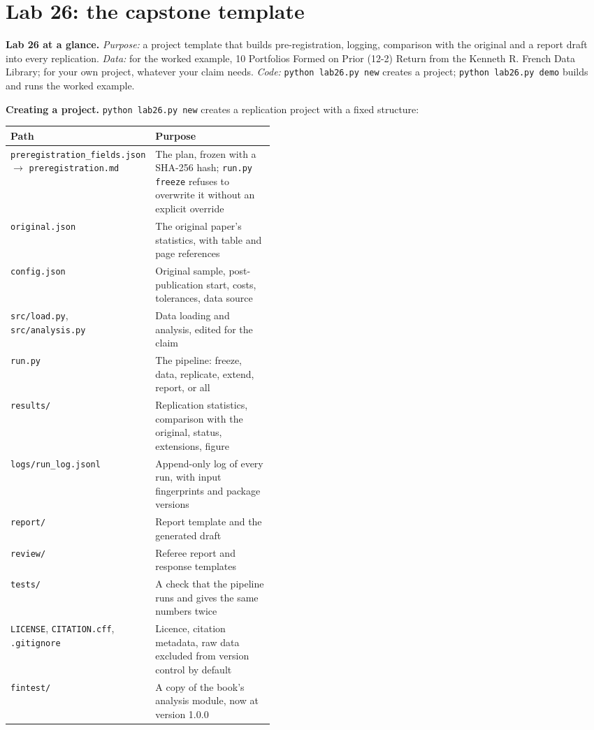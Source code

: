\section{Lab 26: the capstone template}
\label{sec:26-lab}

\begin{callout}
\textbf{Lab 26 at a glance.} \emph{Purpose:} a project template that builds pre-registration, logging, comparison with the original and a report draft into every replication. \emph{Data:} for the worked example, 10 Portfolios Formed on Prior (12-2) Return from the Kenneth R. French Data Library; for your own project, whatever your claim needs. \emph{Code:} \texttt{python lab26.py new} creates a project; \texttt{python lab26.py demo} builds and runs the worked example.
\end{callout}

\textbf{Creating a project.} \texttt{python lab26.py new} creates a replication project with a fixed structure:

\begin{center}
\small
\begin{tabularx}{0.9\linewidth}{@{}>{\raggedright\arraybackslash}p{0.44\linewidth}>{\raggedright\arraybackslash}X@{}}
\toprule
Path & Purpose \\
\midrule
\texttt{preregistration\_fields.json} $\rightarrow$ \texttt{preregistration.md} & The plan, frozen with a SHA-256 hash; \texttt{run.py freeze} refuses to overwrite it without an explicit override \\
\texttt{original.json} & The original paper's statistics, with table and page references \\
\texttt{config.json} & Original sample, post-publication start, costs, tolerances, data source \\
\texttt{src/load.py}, \texttt{src/analysis.py} & Data loading and analysis, edited for the claim \\
\texttt{run.py} & The pipeline: freeze, data, replicate, extend, report, or all \\
\texttt{results/} & Replication statistics, comparison with the original, status, extensions, figure \\
\texttt{logs/run\_log.jsonl} & Append-only log of every run, with input fingerprints and package versions \\
\texttt{report/} & Report template and the generated draft \\
\texttt{review/} & Referee report and response templates \\
\texttt{tests/} & A check that the pipeline runs and gives the same numbers twice \\
\texttt{LICENSE}, \texttt{CITATION.cff}, \texttt{.gitignore} & Licence, citation metadata, raw data excluded from version control by default \\
\texttt{fintest/} & A copy of the book's analysis module, now at version 1.0.0 \\
\bottomrule
\end{tabularx}
\end{center}

